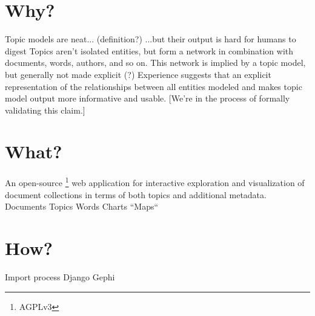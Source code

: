 \documentclass[a4paper,10pt]{article}
\title{}
\author{}
\begin{document}
\maketitle

\begin{abstract}

\end{abstract}

\section{Why?}
Topic models are neat... (definition?)
...but their output is hard for humans to digest
Topics aren't isolated entities, but form a network in combination with documents, words, authors, and so on.
This network is implied by a topic model, but generally not made explicit (?)
Experience suggests that an explicit representation of the relationships between all entities modeled and makes topic model output more informative and usable.
[We're in the process of formally validating this claim.]

\section{What?}
An open-source \footnote{AGPLv3} web application for interactive exploration and visualization of document collections in terms of both topics and additional metadata.
Documents
Topics
Words
Charts
``Maps``

\section{How?}
Import process
Django
Gephi
\end{document}
